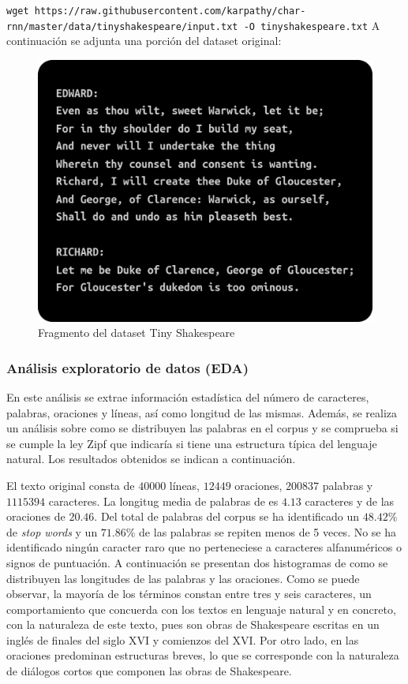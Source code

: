 \documentclass[11pt]{book}
\begin{document}
\texttt{wget https://raw.githubusercontent.com/karpathy/char-rnn/master/data/tinyshakespeare/input.txt -O tinyshakespeare.txt}
A continuación se adjunta una porción del dataset original: 
\begin{figure}[h]
    \centering
    \includegraphics[width=0.5\linewidth]{img/tiny_shakespeare.png}
    \caption{Fragmento del dataset Tiny Shakespeare}
    \label{fig:placeholder1}
\end{figure}

\subsubsection{Análisis exploratorio de datos (EDA)}
En este análisis se extrae información estadística del número de caracteres, palabras, oraciones y líneas, así como longitud de las mismas. Además, se realiza un análisis sobre como se distribuyen las palabras en el corpus y se comprueba si se cumple la ley Zipf \parencite{zhou2024zipf_nlp} que indicaría si tiene una estructura típica del lenguaje natural. Los resultados obtenidos se indican a continuación.

El texto original consta de $40000$ líneas, $12449$ oraciones, $200837$ palabras y $1115394$ caracteres. La longitug media de palabras de es $4.13$ caracteres y de las oraciones de $20.46$. Del total de palabras del corpus se ha identificado un $48.42$\% de \textit{stop words} y un $71.86$\% de las palabras se repiten menos de 5 veces. No se ha identificado ningún caracter raro que no perteneciese a caracteres alfanuméricos o signos de puntuación. A continuación se presentan dos histogramas de como se distribuyen las longitudes de las palabras y las oraciones. Como se puede observar, la mayoría de los términos constan entre tres y seis caracteres, un comportamiento que concuerda con los textos en lenguaje natural y en concreto, con la naturaleza de este texto, pues son obras de Shakespeare escritas en un inglés de finales del siglo XVI y comienzos del XVI. Por otro lado, en las oraciones predominan estructuras breves, lo que se corresponde con la naturaleza de diálogos cortos que componen las obras de Shakespeare.
\end{document}
